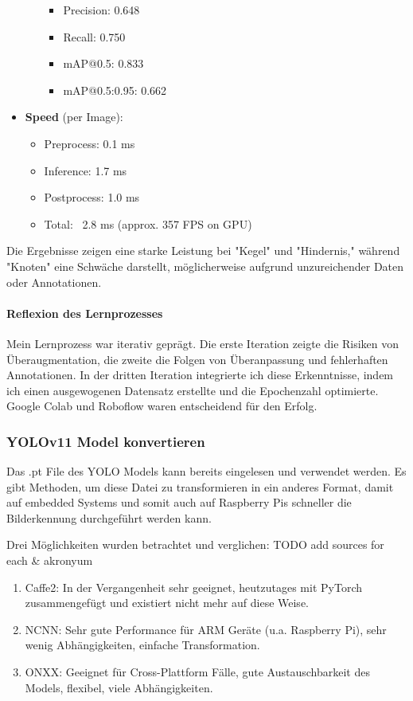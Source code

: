 \begin{itemize}
\begin{itemize}
\begin{itemize}
            \item Precision: 0.648
            \item Recall: 0.750
            \item mAP@0.5: 0.833
            \item mAP@0.5:0.95: 0.662
        \end{itemize}
    \end{itemize}
    \item \textbf{Speed} (per Image):
    \begin{itemize}
        \item Preprocess: 0.1 ms
        \item Inference: 1.7 ms
        \item Postprocess: 1.0 ms
        \item Total: ~2.8 ms (approx. 357 FPS on GPU)
    \end{itemize}
\end{itemize}


Die Ergebnisse zeigen eine starke Leistung bei "Kegel" und "Hindernis," während "Knoten" eine Schwäche darstellt, möglicherweise aufgrund unzureichender Daten oder Annotationen.

\paragraph{Reflexion des Lernprozesses}

Mein Lernprozess war iterativ geprägt. Die erste Iteration zeigte die Risiken von Überaugmentation, die zweite die Folgen von Überanpassung und fehlerhaften Annotationen. In der dritten Iteration integrierte ich diese Erkenntnisse, indem ich einen ausgewogenen Datensatz erstellte und die Epochenzahl optimierte. Google Colab und Roboflow waren entscheidend für den Erfolg.







\subsubsection{YOLOv11 Model konvertieren}
\label{convert-yolo}

Das .pt File des YOLO Models kann bereits eingelesen und verwendet werden. Es gibt Methoden, um diese Datei zu transformieren in ein anderes Format, damit auf embedded Systems und somit auch auf Raspberry Pis schneller die Bilderkennung durchgeführt werden kann.

Drei Möglichkeiten wurden betrachtet und verglichen:
TODO add sources for each \& akronyum
\begin{enumerate}
    \item Caffe2: In der Vergangenheit sehr geeignet, heutzutages mit PyTorch zusammengefügt und existiert nicht mehr auf diese Weise.
    \item NCNN: Sehr gute Performance für ARM Geräte (u.a. Raspberry Pi), sehr wenig Abhängigkeiten, einfache Transformation.
    \item ONXX: Geeignet für  Cross-Plattform Fälle, gute Austauschbarkeit des Models, flexibel, viele Abhängigkeiten.
\end{enumerate}

